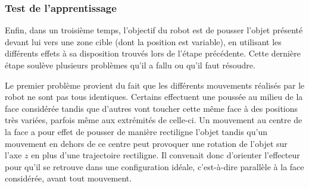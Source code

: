 \documentclass{llncs}
\begin{document}
\subsubsection{Test de l'apprentissage}

Enfin, dans un troisième temps, l'objectif du robot est de pousser l'objet présenté devant lui vers une zone cible (dont la position est variable), en utilisant les différents effets à sa disposition trouvés lors de l'étape précédente.
Cette dernière étape soulève plusieurs problèmes qu'il a fallu ou qu'il faut résoudre.



Le premier problème provient du fait que les différents mouvements réalisés par le robot ne sont pas tous identiques.
Certains effectuent une poussée au milieu de la face considérée tandis que d'autres vont toucher cette même face à des positions très variées, parfois même aux extrémités de celle-ci.
Un mouvement au centre de la face a pour effet de pousser de manière rectiligne l'objet tandis qu'un mouvement en dehors de ce centre peut provoquer une rotation de l'objet sur l'axe $z$ en plus d'une trajectoire rectiligne.
Il convenait donc d'orienter l'effecteur pour qu'il se retrouve dans une configuration idéale, c'est-à-dire parallèle à la face considérée, avant tout mouvement.
\end{document}
